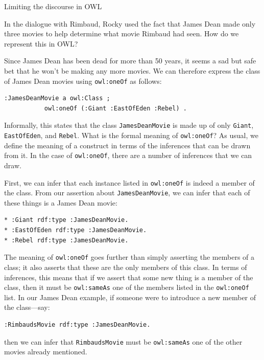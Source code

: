 \begin{challenge}{Limiting the discourse in OWL}

In the dialogue with Rimbaud, Rocky used the fact that James Dean made
only three movies to help determine what movie Rimbaud had seen. How do
we represent this in OWL?

\solution

Since James Dean has been dead for more than 50 years, it seems a sad
but safe bet that he won't be making any more movies. We can therefore
express the class of James Dean movies using \texttt{owl:oneOf} as follows:

\begin{lstlisting}
:JamesDeanMovie a owl:Class ;
           owl:oneOf (:Giant :EastOfEden :Rebel) .
\end{lstlisting}

Informally, this states that the class \texttt{JamesDeanMovie} is made up of only
\texttt{Giant}, \texttt{EastOfEden}, and \texttt{Rebel}. What is the formal meaning of \texttt{owl:oneOf}?
As usual, we define the meaning of a construct in terms of the
inferences that can be drawn from it. In the case of \texttt{owl:oneOf}, there
are a number of inferences that we can draw.

First, we can infer that each instance listed in \texttt{owl:oneOf} is indeed a
member of the class. From our assertion about \texttt{JamesDeanMovie}, we can
infer that each of these things is a James Dean movie:

\begin{lstlisting}
* :Giant rdf:type :JamesDeanMovie.
* :EastOfEden rdf:type :JamesDeanMovie.
* :Rebel rdf:type :JamesDeanMovie.
\end{lstlisting}

The meaning of \texttt{owl:oneOf} goes further than simply asserting the members
of a class; it also asserts that these are the only members of this
class. In terms of inferences, this means that if we assert that some
new thing is a member of the class, then it must be \texttt{owl:sameAs} one of
the members listed in the \texttt{owl:oneOf} list. In our James Dean example, if
someone were to introduce a new member of the class---say:

\begin{lstlisting}
:RimbaudsMovie rdf:type :JamesDeanMovie.
\end{lstlisting}

then we can infer that \texttt{RimbaudsMovie} must be \texttt{owl:sameAs} one of the other movies
already mentioned.
\end{challenge}

